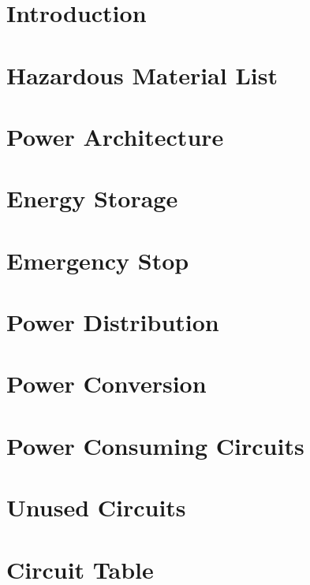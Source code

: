 \section{Introduction}



\section{Hazardous Material List}


\section{Power Architecture}



\section{Energy Storage}

\section{Emergency Stop}

\section{Power Distribution}

\section{Power Conversion}

\section{Power Consuming Circuits}

\section{Unused Circuits}

\section{Circuit Table}




